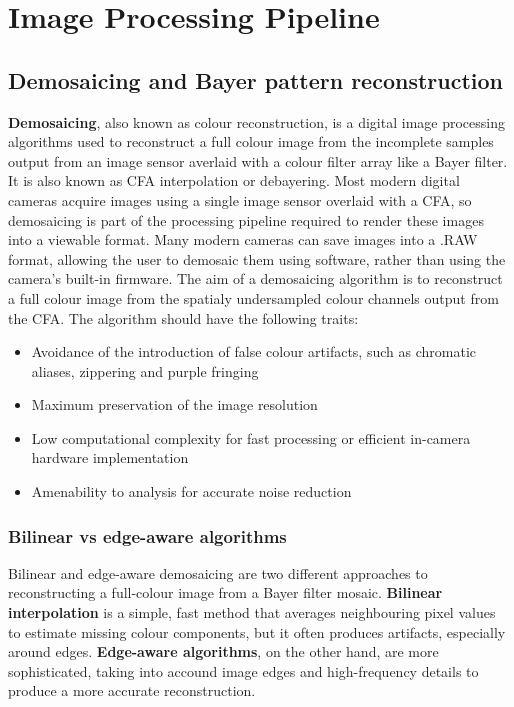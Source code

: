 
\section{Image Processing Pipeline}

\subsection{Demosaicing and Bayer pattern reconstruction}
\textbf{Demosaicing}, also known as colour reconstruction, is a digital image processing algorithms used to reconstruct a full colour image from the incomplete samples output from an image sensor averlaid with a colour filter array like a Bayer filter. It is also known as CFA interpolation or debayering.
\nl
Most modern digital cameras acquire images using a single image sensor overlaid with a CFA, so demosaicing is part of the processing pipeline required to render these images into a viewable format. Many modern cameras can save images into a .RAW format, allowing the user to demosaic them using software, rather than using the camera's built-in firmware.
\nl
The aim of a demosaicing algorithm is to reconstruct a full colour image from the spatialy undersampled colour channels output from the CFA. The algorithm should have the following traits:
\begin{itemize}
    \item Avoidance of the introduction of false colour artifacts, such as chromatic aliases, zippering and purple fringing
    \item Maximum preservation of the image resolution
    \item Low computational complexity for fast processing or efficient in-camera hardware implementation
    \item Amenability to analysis for accurate noise reduction
\end{itemize}

\subsubsection{Bilinear vs edge-aware algorithms}
Bilinear and edge-aware demosaicing are two different approaches to reconstructing a full-colour image from a Bayer filter mosaic.
\nl
\textbf{Bilinear interpolation} is a simple, fast method that averages neighbouring pixel values to estimate missing colour components, but it often produces artifacts, especially around edges.
\nl
\textbf{Edge-aware algorithms}, on the other hand, are more sophisticated, taking into accound image edges and high-frequency details to produce a more accurate reconstruction.

